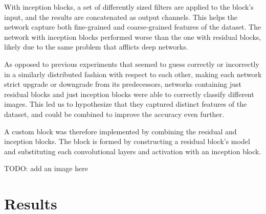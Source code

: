 \documentclass[11pt]{article}
\begin{document}
\begin{multicols}{2}
      With inception blocks\cite{Inception}, a set of differently sized filters are applied to the block's 
      input, and the results are concatenated as output channels. This helps the network 
      capture both fine-grained and coarse-grained features of the dataset. The network
      with inception blocks performed worse than the one with residual blocks, likely
      due to the same problem that afflicts deep networks.

      As opposed to previous experiments that seemed to guess correctly or
      incorrectly in a similarly distributed fashion with respect to each
      other, making each network strict upgrade or downgrade from its predecessors, 
      networks containing just residual blocks and just inception blocks were able to correctly
      classify different images. This led us to hypothesize that they captured distinct 
      features of the dataset, and could be combined to improve the accuracy even further.

      A custom block was therefore implemented by combining the residual and
      inception blocks. The block is formed by constructing a residual block's model and
      substituting each convolutional layers and activation with an inception block.

      TODO: add an image here

      \label{sec:results}
      \section{Results}


\end{multicols}
\end{document}
